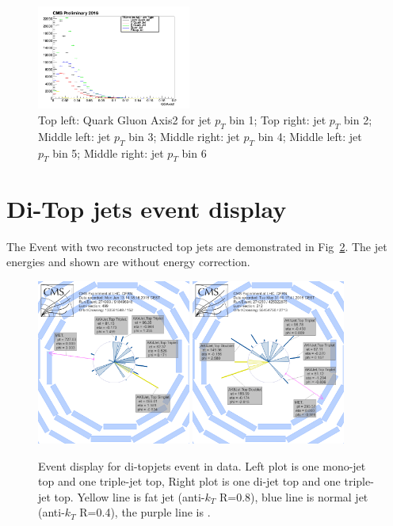 \begin{figure}[htbp]
\begin{center}
  \includegraphics[width=0.45\textwidth]{sections/mc4/TopTagger/figures/_b_qgaxis2jetptbin5_.png}
 \end{center}
 \caption{Top left: Quark Gluon Axis2 for jet $p_{T}$ bin 1; Top right: jet $p_{T}$ bin 2; Middle left: jet $p_{T}$ bin 3; Middle right: jet $p_{T}$ bin 4; Middle left: jet $p_{T}$ bin 5; Middle right: jet $p_{T}$ bin 6}
 \label{fig:c4ttqgaxis2jetpt}
\end{figure}

\clearpage
\section{Di-Top jets event display}
The Event with two reconstructed top jets are demonstrated in Fig~\ref{fig:appttevtdisplay}. The jet energies and \MET shown are without energy correction.
\begin{figure}[htbp]
 \begin{center}
  \includegraphics[width=0.45\textwidth]{figures/appendix/appendix_tagger_Run2016B_2t_1j3j-274999_918496948_499_RhoPhi.png}
  \includegraphics[width=0.45\textwidth]{figures/appendix/appendix_tagger_Run2016B_2t_2j3j-274250_425322875_212_RhoPhi.png}
\end{center} \caption{Event display for di-topjets event in data. Left plot is one mono-jet top and one triple-jet top, Right plot is one di-jet top and one triple-jet top. Yellow line is fat jet (anti-$k_{T}$ R=0.8), blue line is normal jet (anti-$k_{T}$ R=0.4), the purple line is \MET.}
 \label{fig:appttevtdisplay}
\end{figure}

